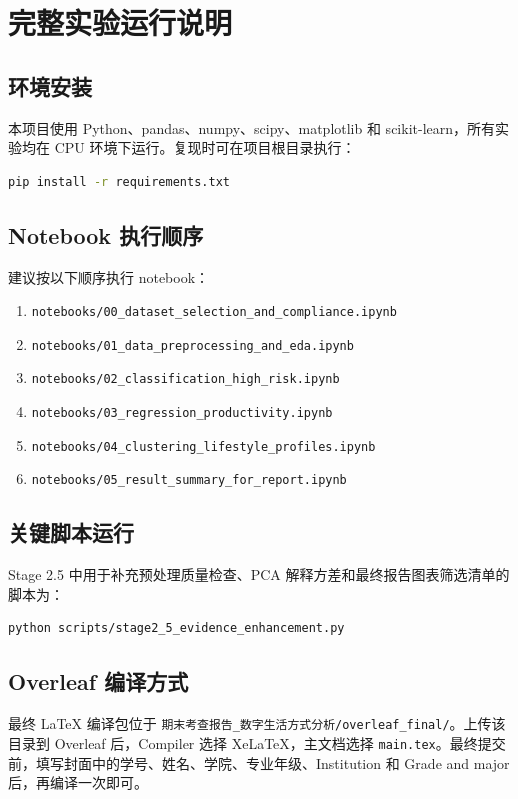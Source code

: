 \chapter{完整实验运行说明}

\section{环境安装}

本项目使用 Python、pandas、numpy、scipy、matplotlib 和 scikit-learn，所有实验均在 CPU 环境下运行。复现时可在项目根目录执行：

\begin{lstlisting}[language=bash,caption={依赖安装命令},label={lst:appendix-install}]
pip install -r requirements.txt
\end{lstlisting}

\section{Notebook 执行顺序}

建议按以下顺序执行 notebook：

\begin{enumerate}
  \item \texttt{notebooks/00\_dataset\_selection\_and\_compliance.ipynb}
  \item \texttt{notebooks/01\_data\_preprocessing\_and\_eda.ipynb}
  \item \texttt{notebooks/02\_classification\_high\_risk.ipynb}
  \item \texttt{notebooks/03\_regression\_productivity.ipynb}
  \item \texttt{notebooks/04\_clustering\_lifestyle\_profiles.ipynb}
  \item \texttt{notebooks/05\_result\_summary\_for\_report.ipynb}
\end{enumerate}

\section{关键脚本运行}

Stage 2.5 中用于补充预处理质量检查、PCA 解释方差和最终报告图表筛选清单的脚本为：

\begin{lstlisting}[language=bash,caption={证据增强脚本},label={lst:appendix-stage25}]
python scripts/stage2_5_evidence_enhancement.py
\end{lstlisting}

\section{Overleaf 编译方式}

最终 LaTeX 编译包位于 \texttt{期末考查报告\_数字生活方式分析/overleaf\_final/}。上传该目录到 Overleaf 后，Compiler 选择 XeLaTeX，主文档选择 \texttt{main.tex}。最终提交前，填写封面中的学号、姓名、学院、专业年级、Institution 和 Grade and major 后，再编译一次即可。
